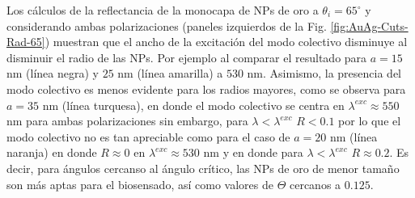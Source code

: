 Los cálculos de la reflectancia de la monocapa de NPs de oro a $\theta_i=65^\circ$ y considerando ambas polarizaciones (paneles izquierdos de la Fig. \ref{fig:AuAg-Cuts-Rad-65}) muestran que el ancho de la excitación del modo colectivo disminuye  al disminuir el radio de las NPs. Por ejemplo al comparar el resultado para $a=15$ nm (línea negra) y $25$ nm (línea amarilla) a $530$ nm. Asimismo, la presencia del modo colectivo es menos evidente para los radios mayores, como se observa para $a=35$ nm (línea turquesa), en donde el modo colectivo  se centra en $\lambda^{exc}\approx 550$ nm para ambas polarizaciones sin embargo, para $\lambda<\lambda^{exc}$ $R<0.1$ por lo que el modo colectivo no es tan apreciable como para el caso de $a=20$ nm (línea naranja) en donde $R\approx 0$ en $\lambda^{exc}\approx 530$ nm y en donde para $\lambda<\lambda^{exc}$ $R\approx 0.2$. Es decir, para ángulos cercanso al ángulo crítico, las NPs de oro de menor tamaño son más aptas para el biosensado, así como valores de $\Theta$ cercanos a $0.125$.


